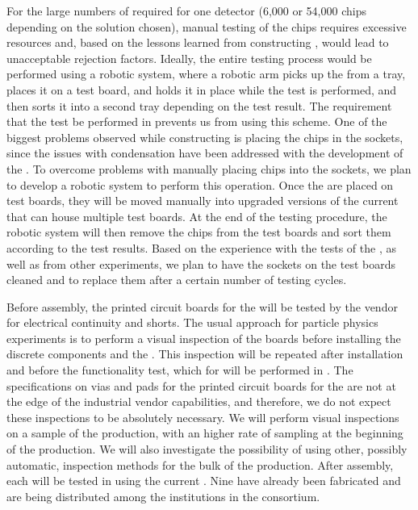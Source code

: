 For the large numbers of
 required for one   detector
(6,000 or 54,000 chips depending on the  solution
chosen), manual testing of the chips requires excessive 
resources and, based on the lessons learned from  
constructing  , would lead to unacceptable rejection
factors. Ideally, the entire testing
process would be performed using a robotic system, where 
a robotic arm picks up the  from a tray, places
it on a test board, and holds it in place while the test
is performed, and then sorts it into a second tray
depending on the test result. The requirement that the test
be performed in \lntwo prevents us from using this
scheme. One of the biggest problems observed while constructing
 is placing the chips in
the sockets, since the issues with condensation
have been addressed with the development of the .
To overcome problems with manually placing chips into
the sockets, we plan to develop a robotic system
to perform this operation. Once the  are 
placed on test boards, they will be moved manually into 
upgraded versions of the current  that can
house multiple test boards. At the end of the testing
procedure, the robotic system will then remove
the chips from the test boards and sort them according to
the test results. Based on the experience with the tests of
the  , as well as from other experiments,
we plan to have the sockets on the 
test boards cleaned and to replace them after a certain number of
testing cycles. 

Before assembly, the printed circuit boards for the
 will be tested by the vendor for electrical
continuity and shorts. The usual approach for particle physics
experiments is to perform a visual inspection of the boards
before installing the discrete components and 
the . This inspection will be repeated after 
installation and before the functionality test, which for  will
be performed in \lntwo. The specifications on vias and pads for the printed
circuit boards for the  are not at the edge of the
industrial vendor capabilities, and therefore, we do not
expect these inspections to be absolutely necessary. We will
perform visual inspections on a sample of the 
production, with an higher rate of sampling at the beginning
of the production. We will also investigate the possibility
of using other, possibly automatic, inspection methods for
the bulk of the production. After assembly, 
each  will be tested in \lntwo using
the current . Nine  have already been
fabricated and are being distributed among the institutions
in the consortium. 

